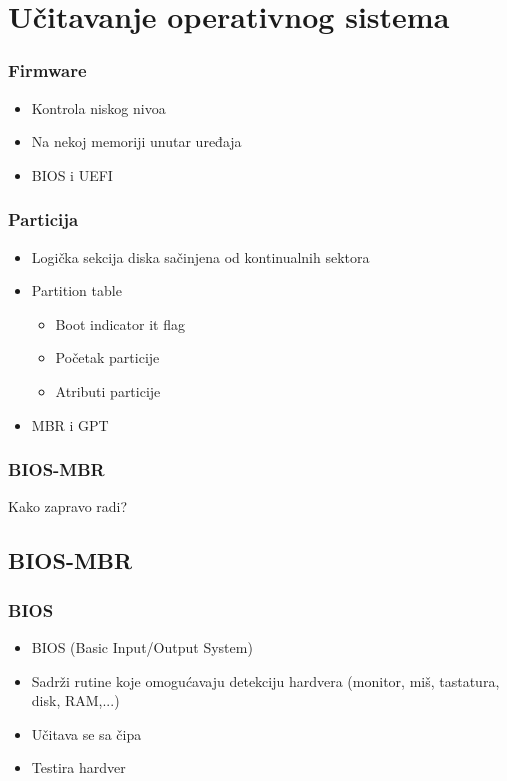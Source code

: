 \documentclass{beamer}
\begin{document}
\section*{Učitavanje operativnog sistema}
\begin{frame}
    \frametitle{Firmware}
    \begin{itemize}
        \item Kontrola niskog nivoa \newline
        \item Na nekoj memoriji unutar uređaja \newline
        \item BIOS i UEFI
    \end{itemize}
\end{frame}

\begin{frame}
    \frametitle{Particija}
    \begin{itemize}
        \item Logička sekcija diska sačinjena od kontinualnih sektora \newline
        \item Partition table \begin{itemize}
            \item Boot indicator it flag \newline
            \item Početak particije \newline
            \item Atributi particije \newline
        \end{itemize}
        \item MBR i GPT
    \end{itemize}
\end{frame}

\begin{frame}
    \frametitle{BIOS-MBR}
    \begin{center}
        \LARGE{Kako zapravo radi?}
    \end{center}
\end{frame}

\subsection*{BIOS-MBR}
\begin{frame}
    \frametitle{BIOS}
    \begin{itemize}
        \item BIOS (Basic Input/Output System) \newline
        \item Sadrži rutine koje omogućavaju detekciju hardvera (monitor, miš, tastatura, disk, RAM,...) \newline
        \item Učitava se sa čipa \newline
        \item Testira hardver
    \end{itemize}
\end{frame}
\end{document}
